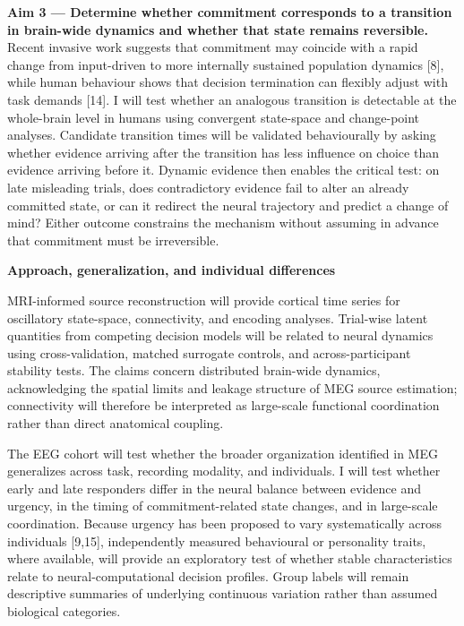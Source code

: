 \documentclass[12pt,letterpaper]{article}
\newcommand{\nsercsection}[1]{\Needspace{2\baselineskip}\vspace{3pt}\noindent\textbf{#1}\par\vspace{0pt}}
\newcommand{\citep}[1]{[#1]}
\begin{document}
\textbf{Aim 3 --- Determine whether commitment corresponds to a transition in brain-wide dynamics and whether that state remains reversible.} Recent invasive work suggests that commitment may coincide with a rapid change from input-driven to more internally sustained population dynamics \citep{8}, while human behaviour shows that decision termination can flexibly adjust with task demands \citep{14}. I will test whether an analogous transition is detectable at the whole-brain level in humans using convergent state-space and change-point analyses. Candidate transition times will be validated behaviourally by asking whether evidence arriving after the transition has less influence on choice than evidence arriving before it. Dynamic evidence then enables the critical test: on late misleading trials, does contradictory evidence fail to alter an already committed state, or can it redirect the neural trajectory and predict a change of mind? Either outcome constrains the mechanism without assuming in advance that commitment must be irreversible.

\nsercsection{Approach, generalization, and individual differences}
MRI-informed source reconstruction will provide cortical time series for oscillatory state-space, connectivity, and encoding analyses. Trial-wise latent quantities from competing decision models will be related to neural dynamics using cross-validation, matched surrogate controls, and across-participant stability tests. The claims concern distributed brain-wide dynamics, acknowledging the spatial limits and leakage structure of MEG source estimation; connectivity will therefore be interpreted as large-scale functional coordination rather than direct anatomical coupling.

The EEG cohort will test whether the broader organization identified in MEG generalizes across task, recording modality, and individuals. I will test whether early and late responders differ in the neural balance between evidence and urgency, in the timing of commitment-related state changes, and in large-scale coordination. Because urgency has been proposed to vary systematically across individuals \citep{9,15}, independently measured behavioural or personality traits, where available, will provide an exploratory test of whether stable characteristics relate to neural-computational decision profiles. Group labels will remain descriptive summaries of underlying continuous variation rather than assumed biological categories.
\end{document}
